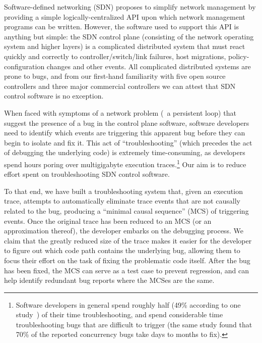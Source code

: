 Software-defined networking (SDN) proposes to simplify network management by
providing a simple logically-centralized API upon which network management
programs can be written. However, the software used to support this API is
anything but simple: the SDN control plane (consisting of the network
operating system and higher layers) is a complicated distributed system that
must react quickly and correctly to controller/switch/link failures, host migrations,
policy-configuration changes and other events.
All complicated distributed systems are prone to bugs, and from our first-hand
familiarity with five open source controllers and three major commercial
controllers we can attest that SDN control software is no exception.

When faced with symptoms of a network problem (\eg~a persistent loop)
that suggest the presence of a bug in the control plane software,
software developers need to identify which events are triggering
this apparent bug before they can begin to isolate and fix it.
This act of ``troubleshooting'' (which precedes the act of debugging the
underlying code) is extremely time-consuming, as developers spend hours poring
over multigigabyte execution traces.\footnote{Software developers in general spend roughly half (49\% according to one
study~\cite{msoft_concurrency}) of their time troubleshooting, and spend
considerable time troubleshooting bugs that are difficult to trigger (the same study found
that 70\% of the reported concurrency bugs take days to months to fix).}
Our aim is to reduce effort spent on troubleshooting SDN control software.

To that end, we have built a troubleshooting system that,
given an execution trace, attempts to automatically eliminate
trace events that are not causally related to the bug, producing a ``minimal
causal sequence'' (MCS) of triggering events. Once the original trace has
been reduced to an MCS (or an approximation thereof), the developer embarks
on the debugging process. We claim that the greatly reduced size of the
trace makes it easier for the developer to figure out which code path contains
the underlying bug, allowing them to focus their effort on
the task of fixing the problematic code itself. After the bug has been fixed, the MCS
can serve as a test case to prevent regression,
and can help identify redundant bug reports where the MCSes are the same.

